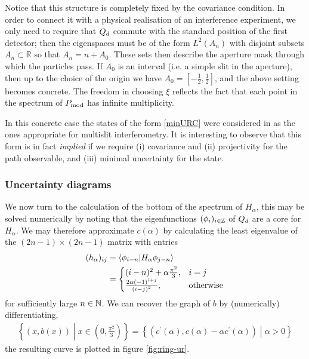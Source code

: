 Notice that this structure is completely fixed by the covariance condition. In order to connect it with a physical realisation of an interference experiment, we only need to require that $Q_d$ commute with the standard position of the first detector; then the eigenspaces must be of the form $L^2(A_n)$ with disjoint subsets $A_n\subset \mathbb R$ so that $A_n = n+ A_0$. These sets then describe the aperture mask through which the particles pass. If $A_0$ is an interval (i.e. a simple slit in the aperture), then up to the choice of the origin we have $A_0=[-\frac 12,\frac 12]$, and the above setting becomes concrete. The freedom in choosing $\xi$ reflects the fact that each point in the spectrum of $P_{\mathrm{mod}}$ has infinite multiplicity. 

In this concrete case the states of the form \eqref{minURC} were considered in \cite{BB2013} as the ones appropriate for multislit interferometry. It is interesting to observe that this form is in fact \emph{implied} if we require (i) covariance and (ii) projectivity for the path observable, and (iii) minimal uncertainty for the state.

\subsubsection{Uncertainty diagrams}
We now turn to the calculation of the bottom of the spectrum of $H_\alpha$, this may be solved numerically by noting that the eigenfunctions $(\phi_i)_{i\in\mathbb{Z}}$ of $Q_d$ are a core for $H_\alpha$. We may therefore approximate $c(\alpha)$ by calculating the least eigenvalue of the $(2n-1)\times (2n-1)$ matrix with entries
\begin{align}
  (h_\alpha)_{ij} &= \langle \phi_{i-n}|H_\alpha \phi_{j-n}\rangle\\
                  &= \begin{cases}(i-n)^2 + \alpha\frac{\pi^2}{3},& i = j\\ \frac{2 \alpha(-1)^{i+j}}{(i-j)^2}, & \text{otherwise}\end{cases}
\end{align}
for sufficiently large $n\in\mathbb{N}$. We can recover the graph of $b$ by (numerically) differentiating, 
\begin{align}
  \left\{(x,b(x))\middle|x\in \left(0,\frac{\pi^2}{3}\right)\right\} = \left\{ (c^\prime(\alpha), c(\alpha)-\alpha c^\prime(\alpha))\middle| \alpha > 0\right\}
\end{align}
the resulting curve is plotted in figure \ref{fig:ring-ur}.

